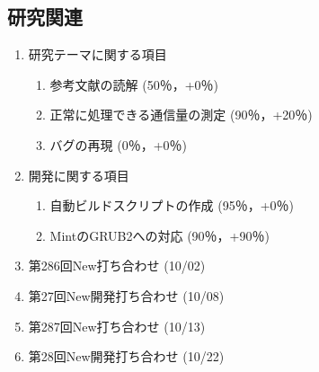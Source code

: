 \documentclass[fleqn, 14pt]{extarticle}
\begin{document}
    \subsection{研究関連}
    \label{sec-2-1}
    \begin{enumerate}

        \item 研究テーマに関する項目
            \hfill
            \label{enum-research1}
            \begin{enumerate}

                \item 参考文献の読解
                    \hfill
                    \label{enum-1-A}
                    (50％，+0％)

                \item 正常に処理できる通信量の測定
                    \hfill
                    \label{enum-1-B}
                    (90％，+20％)

                \item バグの再現
                    \hfill
                    \label{enum-1-C}
                    (0％，+0％)

            \end{enumerate}

        \item 開発に関する項目
            \hfill
            \label{enum-research2}
            \begin{enumerate}

                \item 自動ビルドスクリプトの作成
                    \hfill
                    \label{enum-2-A}
                    (95％，+0％)

                \item MintのGRUB2への対応
                    \hfill
                    \label{enum-2-B}
                    (90％，+90％)

            \end{enumerate}

        \item 第286回New打ち合わせ
            \hfill
            \label{enum-research3}
            (10/02)

        \item 第27回New開発打ち合わせ 
            \hfill
            \label{enum-research3}
            (10/08)

        \item 第287回New打ち合わせ
            \hfill
            \label{enum-research3}
            (10/13)

        \item 第28回New開発打ち合わせ 
            \hfill
            \label{enum-research3}
            (10/22)

    \end{enumerate}
\end{document}
